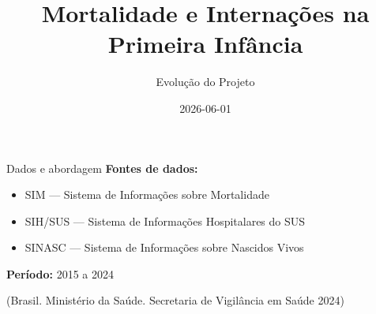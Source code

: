 \documentclass[
  ignorenonframetext,
  brazilian,
]{beamer}
\title{\texorpdfstring{Mortalidade e Internações na Primeira
Infância}{Mortalidade e Internações na Primeira Infância}}
\subtitle{\texorpdfstring{Evolução do Projeto}{Evolução do Projeto}}
\author{}
\date{2026-06-01}
\providecommand{\tightlist}{%
  \setlength{\itemsep}{0pt}\setlength{\parskip}{0pt}}
\begin{document}
\frame{\titlepage}


\begin{frame}{Dados e abordagem}
\protect{}\label{dados-e-abordagem}
\textbf{Fontes de dados:}\\

\begin{itemize}
\tightlist
\item
  SIM --- Sistema de Informações sobre Mortalidade\\
\item
  SIH/SUS --- Sistema de Informações Hospitalares do SUS\\
\item
  SINASC --- Sistema de Informações sobre Nascidos Vivos\\
\end{itemize}

\textbf{Período:} 2015 a 2024

(Brasil. Ministério da Saúde. Secretaria de Vigilância em Saúde 2024)
\end{frame}
\end{document}
